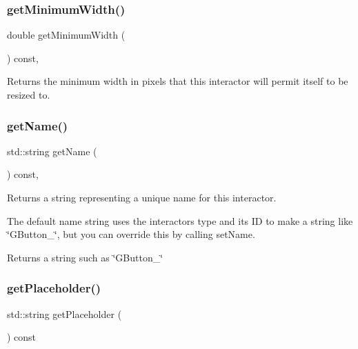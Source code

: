 \subsubsection{\texorpdfstring{get\+Minimum\+Width()}{getMinimumWidth()}}
{\footnotesize\ttfamily double get\+Minimum\+Width (\begin{DoxyParamCaption}{ }\end{DoxyParamCaption}) const\hspace{0.3cm}{\ttfamily [virtual]}, {\ttfamily [inherited]}}



Returns the minimum width in pixels that this interactor will permit itself to be resized to. 

\mbox{\label{classsgl_1_1GInteractor_a8a60438a5b55d0b2ceb35c8674b9d8c5}} 
\subsubsection{\texorpdfstring{get\+Name()}{getName()}}
{\footnotesize\ttfamily std\+::string get\+Name (\begin{DoxyParamCaption}{ }\end{DoxyParamCaption}) const\hspace{0.3cm}{\ttfamily [virtual]}, {\ttfamily [inherited]}}



Returns a string representing a unique name for this interactor. 

The default name string uses the interactor\textquotesingle{}s type and its ID to make a string like \char`\"{}\+G\+Button\+\_\char`\"{}, but you can override this by calling set\+Name. \begin{DoxyReturn}{Returns}
a string such as \char`\"{}\+G\+Button\+\_\char`\"{} 
\end{DoxyReturn}
\mbox{\label{classsgl_1_1GTextArea_aa78dbaa7dac1f8cdf9048c91abecc7ad}} 
\subsubsection{\texorpdfstring{get\+Placeholder()}{getPlaceholder()}}
{\footnotesize\ttfamily std\+::string get\+Placeholder (\begin{DoxyParamCaption}{ }\end{DoxyParamCaption}) const\hspace{0.3cm}{\ttfamily [virtual]}}



